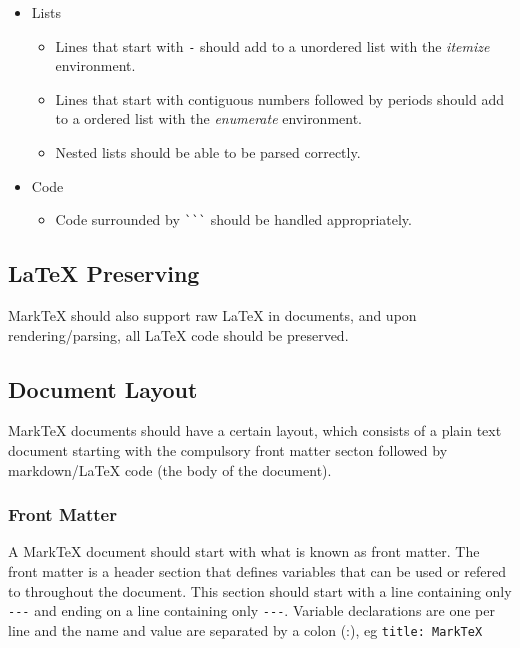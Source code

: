 \documentclass[10pt, a4paper]{article}
\begin{document}
\begin{itemize}
\begin{itemize}
        \item \verb![link-url]! should convert to \verb!\url{link-url}!.
        \item \verb![link-text](link-url)! should convert to \newline \verb!\href{link-url}{link-text}!.
        \item URLs that are written without any wrapping should attempt to be parse to links.
        \item Links should also work with mailto links.
    \end{itemize}
    \item Lists
    \begin{itemize}
        \item Lines that start with \verb!-! should add to a unordered list with the \textit{itemize} environment.
        \item Lines that start with contiguous numbers followed by periods should add to a ordered list with the \textit{enumerate} environment.
        \item Nested lists should be able to be parsed correctly.
    \end{itemize}
    \item Code
    \begin{itemize}
        \item Code surrounded by \texttt{\`}\texttt{\`}\texttt{\`} should be handled appropriately.
    \end{itemize}
\end{itemize}

\subsection{\LaTeX{} Preserving}
MarkTeX should also support raw \LaTeX{} in documents, and upon rendering/par\-sing, all \LaTeX{} code should be preserved.

\subsection{Document Layout}
MarkTeX documents should have a certain layout, which consists of a plain text document starting with the compulsory front matter secton followed by markdown/\LaTeX{} code (the body of the document).
\subsubsection{Front Matter}
A MarkTeX document should start with what is known as front matter. The front matter is a header section that defines variables that can be used or refered to throughout the document. This section should start with a line containing only \verb!---! and ending on a line containing only \verb!---!. Variable declarations are one per line and the name and value are separated by a colon (:), eg \verb!title: MarkTeX!
\end{document}
